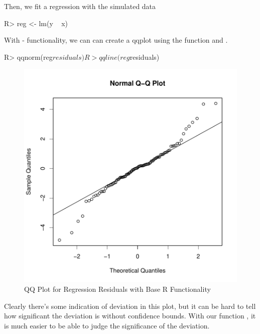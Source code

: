 \documentclass[article]{jss}
\begin{document}
Then, we fit a regression with the simulated data

\begin{Schunk}
\begin{Sinput}
R> reg <- lm(y ~ x)
\end{Sinput}
\end{Schunk}

With - functionality, we can can create a qqplot using the function  and . 

\begin{Schunk}
\begin{Sinput}
R> qqnorm(reg$residuals)
R> qqline(reg$residuals)
\end{Sinput}
\end{Schunk}

\begin{figure}
\begin{center}
\includegraphics{manuscript-base_qqplot}
\end{center}
\caption{QQ Plot for Regression Residuals with Base R Functionality}
\end{figure}


Clearly there's some indication of deviation in this plot, but it can be hard to tell how significant the deviation is without confidence bounds. With our function , it is much easier to be able to judge the significance of the deviation.
\end{document}

